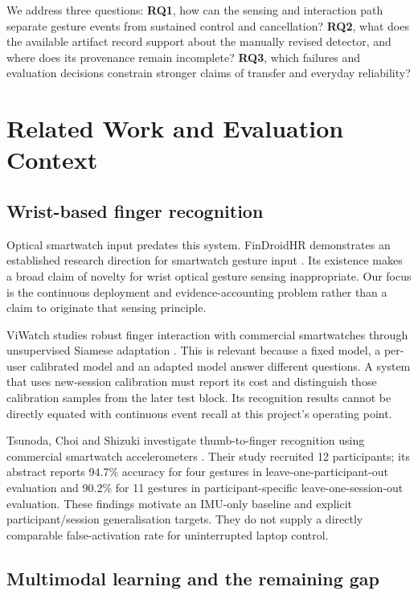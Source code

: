 We address three questions: \textbf{RQ1}, how can the sensing and interaction path separate gesture events from sustained control and cancellation? \textbf{RQ2}, what does the available artifact record support about the manually revised detector, and where does its provenance remain incomplete? \textbf{RQ3}, which failures and evaluation decisions constrain stronger claims of transfer and everyday reliability?

\section{Related Work and Evaluation Context}\label{related-work-and-evaluation-context}

\subsection{Wrist-based finger recognition}\label{wrist-based-finger-recognition}

Optical smartwatch input predates this system. FinDroidHR demonstrates an established research direction for smartwatch gesture input \cite{findroidhr}. Its existence makes a broad claim of novelty for wrist optical gesture sensing inappropriate. Our focus is the continuous deployment and evidence-accounting problem rather than a claim to originate that sensing principle.

ViWatch studies robust finger interaction with commercial smartwatches through unsupervised Siamese adaptation \cite{viwatch}. This is relevant because a fixed model, a per-user calibrated model and an adapted model answer different questions. A system that uses new-session calibration must report its cost and distinguish those calibration samples from the later test block. Its recognition results cannot be directly equated with continuous event recall at this project's operating point.

Tsunoda, Choi and Shizuki investigate thumb-to-finger recognition using commercial smartwatch accelerometers \cite{tsunoda}. Their study recruited 12 participants; its abstract reports 94.7\% accuracy for four gestures in leave-one-participant-out evaluation and 90.2\% for 11 gestures in participant-specific leave-one-session-out evaluation. These findings motivate an IMU-only baseline and explicit participant/session generalisation targets. They do not supply a directly comparable false-activation rate for uninterrupted laptop control.

\subsection{Multimodal learning and the remaining gap}\label{multimodal-learning-and-the-remaining-gap}

